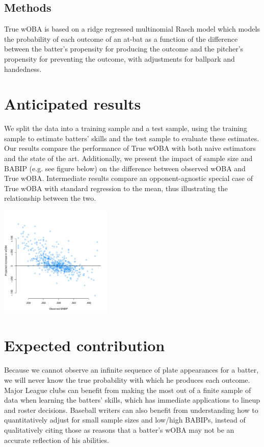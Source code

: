 \documentclass[11pt]{article}
\begin{document}
\subsection{Methods}

True wOBA is based on a ridge regressed multinomial Rasch model which models
the probability of each outcome of an at-bat as a function of the difference
between the batter's propensity for producing the outcome and the pitcher's
propensity for preventing the outcome, with adjustments for ballpark and
handedness.

\section{Anticipated results}

We split the data into a training sample and a test sample, using
the training sample to estimate batters' skills and the test sample to evaluate
these estimates. Our results compare the performance of True wOBA with both
naive estimators and the state of the art. Additionally, we present the impact
of sample size and BABIP (e.g. see figure below) on the difference between
observed wOBA and True wOBA. Intermediate results compare an opponent-agnostic
special case of True wOBA with standard regression to the mean, thus
illustrating the relationship between the two.

\begin{center}
\includegraphics[width = 0.4\textwidth]{../figs/woba-v-babip.pdf}
\end{center}

\section{Expected contribution}

Because we cannot observe an infinite sequence of plate appearances for a
batter, we will never know the true probability with which he produces each
outcome. Major League clubs can benefit from making the most out of a finite
sample of data when learning the batters' skills, which has immediate
applications to lineup and roster decisions. Baseball writers can also benefit
from understanding how to quantitatively adjust for small sample sizes and
low/high BABIPs, instead of qualitatively citing those as reasons that a
batter's wOBA may not be an accurate reflection of his abilities.



\end{document}

